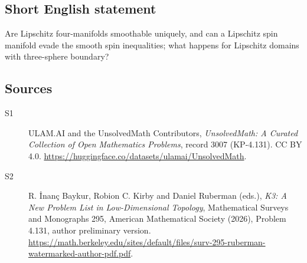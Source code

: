 \documentclass[11pt]{article}
\begin{document}
\subsection{Short English statement}
Are Lipschitz four-manifolds smoothable uniquely, and can a Lipschitz spin manifold evade the smooth spin inequalities; what happens for Lipschitz domains with three-sphere boundary?
\subsection{Sources}
\begin{description}
\item[\hypertarget{source:3007:1}{S1}] ULAM.AI and the UnsolvedMath Contributors, \emph{UnsolvedMath: A Curated Collection of Open Mathematics Problems}, record 3007 (KP-4.131). CC BY 4.0. \url{https://huggingface.co/datasets/ulamai/UnsolvedMath}.
\item[\hypertarget{source:3007:2}{S2}] R. İnanç Baykur, Robion C. Kirby and Daniel Ruberman (eds.), \emph{K3: A New Problem List in Low-Dimensional Topology}, Mathematical Surveys and Monographs 295, American Mathematical Society (2026), Problem 4.131, author preliminary version. \url{https://math.berkeley.edu/sites/default/files/surv-295-ruberman-watermarked-author-pdf.pdf}.
\end{description}
\label{end:3007}
\end{document}
